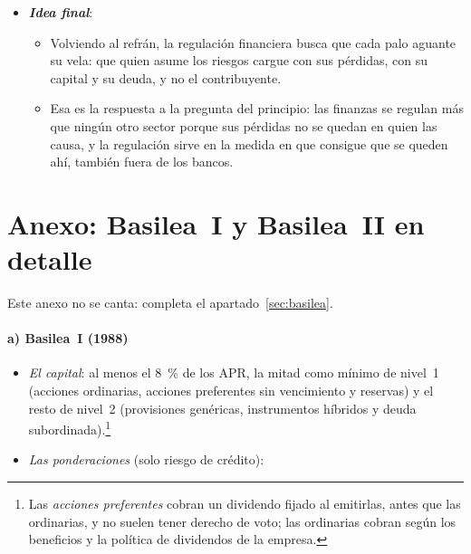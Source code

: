 \documentclass[11pt]{article}
\begin{document}
\begin{itemize}
\begin{itemize}
  \item La regulación de después de 2008 ha hecho a los bancos más resistentes: la covid-19 no acabó en crisis bancaria.
  \item Su punto débil está en los bordes: lo que se escapa del perímetro regulado y los bancos globales, cuya resolución sin dinero público aún no se ha probado.
  \item Y en el tiempo: lejos ya de la crisis, vuelve la presión para relajarla, y conviene recordar a  (1971): «por regla general, la industria adquiere la regulación, que se diseña y se aplica sobre todo en su beneficio».\footnote{En el original, «as a rule, regulation is acquired by the industry and is designed and operated primarily for its benefit» \parencite[3]{Stigler1971Theory}.}
  \end{itemize}
\item \textbf{\emph{Idea final}}:
  \begin{itemize}
  \item Volviendo al refrán, la regulación financiera busca que cada palo aguante su vela: que quien asume los riesgos cargue con sus pérdidas, con su capital y su deuda, y no el contribuyente.
  \item Esa es la respuesta a la pregunta del principio: las finanzas se regulan más que ningún otro sector porque sus pérdidas no se quedan en quien las causa, y la regulación sirve en la medida en que consigue que se queden ahí, también fuera de los bancos.
  \end{itemize}
\end{itemize}

\clearpage
\appendix

\section{Anexo: Basilea~I y Basilea~II en detalle}\label{anexo:basilea}

Este anexo no se canta: completa el apartado~\ref{sec:basilea}.

\paragraph{a) Basilea~I (1988)}

\begin{itemize}
\item \emph{El capital}: al menos el 8~\% de los APR, la mitad como mínimo de nivel~1 (acciones ordinarias, acciones preferentes sin vencimiento y reservas) y el resto de nivel~2 (provisiones genéricas, instrumentos híbridos y deuda subordinada).\footnote{Las \emph{acciones preferentes} cobran un dividendo fijado al emitirlas, antes que las ordinarias, y no suelen tener derecho de voto; las ordinarias cobran según los beneficios y la política de dividendos de la empresa.}
\item \emph{Las ponderaciones} (solo riesgo de crédito):
\end{itemize}
\end{document}
